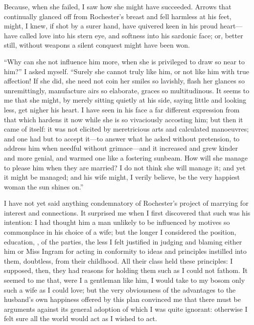 Because, when she failed, I saw how she might have succeeded. Arrows
that continually glanced off from \Mr{} Rochester's breast and fell
harmless at his feet, might, I knew, if shot by a surer hand, have
quivered keen in his proud heart---have called love into his stern eye,
and softness into his sardonic face; or, better still, without weapons a
silent conquest might have been won.

\enquote{Why can she not influence him more, when she is privileged to
	draw so near to him?} I asked myself. \enquote{Surely she cannot truly
	like him, or not like him with true affection! If she did, she need not
	coin her smiles so lavishly, flash her glances so unremittingly,
	manufacture airs so elaborate, graces so multitudinous. It seems to me
	that she might, by merely sitting quietly at his side, saying little and
	looking less, get nigher his heart. I have seen in his face a far
	different expression from that which hardens it now while she is so
	vivaciously accosting him; but then it came of itself: it was not
	elicited by meretricious arts and calculated manoeuvres; and one had but
	to accept it---to answer what he asked without pretension, to address
	him when needful without grimace---and it increased and grew kinder and
	more genial, and warmed one like a fostering sunbeam. How will she
	manage to please him when they are married? I do not think she will
	manage it; and yet it might be managed; and his wife might, I verily
	believe, be the very happiest woman the sun shines on.}

I have not yet said anything condemnatory of \Mr{} Rochester's project of
marrying for interest and connections. It surprised me when I first
discovered that such was his intention: I had thought him a man unlikely
to be influenced by motives so commonplace in his choice of a wife; but
the longer I considered the position, education, \etc, of the parties,
the less I felt justified in judging and blaming either him or Miss
Ingram for acting in conformity to ideas and principles instilled into
them, doubtless, from their childhood. All their class held these
principles: I supposed, then, they had reasons for holding them such as
I could not fathom. It seemed to me that, were I a gentleman like him,
I would take to my bosom only such a wife as I could love; but the very
obviousness of the advantages to the husband's own happiness offered by
this plan convinced me that there must be arguments against its general
adoption of which I was quite ignorant: otherwise I felt sure all the
world would act as I wished to act.

